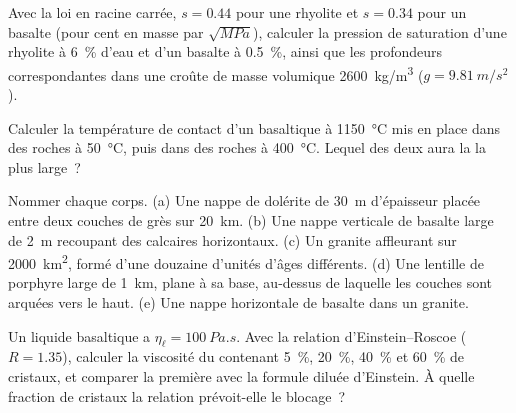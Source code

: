 \begin{exercise}[$\star$]\label{exo:b2:magma-emplacement:2}
Avec la loi en racine carrée, $s = 0.44$ pour une rhyolite et $s = 0.34$ pour un basalte
(pour cent en masse par $\sqrt{\unit{MPa}}$), calculer la pression de saturation d'une
rhyolite à \qty{6}{\percent} d'eau et d'un basalte à \qty{0.5}{\percent}, ainsi que les
profondeurs correspondantes dans une croûte de masse volumique \qty{2600}{kg/m^3}
($g = \qty{9.81}{m/s^2}$).
\end{exercise}

\begin{exercise}[$\star$]\label{exo:b2:magma-emplacement:3}
Calculer la température de contact d'un  basaltique à \qty{1150}{\celsius}
mis en place dans des roches à \qty{50}{\celsius}, puis dans des roches à
\qty{400}{\celsius}. Lequel des deux  aura la  la plus large~?
\end{exercise}

\begin{exercise}[$\star$]\label{exo:b2:magma-emplacement:4}
Nommer chaque corps. (a) Une nappe de dolérite de \qty{30}{m} d'épaisseur placée entre deux couches
de grès sur \qty{20}{km}. (b) Une nappe verticale de basalte large de \qty{2}{m}
recoupant des calcaires horizontaux. (c) Un granite affleurant sur \qty{2000}{km^2},
formé d'une douzaine d'unités d'âges différents. (d) Une lentille de porphyre large de \qty{1}{km},
plane à sa base, au-dessus de laquelle les couches sont arquées vers le haut. (e) Une nappe horizontale
de basalte dans un granite.
\end{exercise}

\begin{exercise}[$\star\star$]\label{exo:b2:magma-emplacement:5}
Un liquide basaltique a $\eta_{\ell} = \qty{100}{Pa.s}$. Avec la relation d'Einstein--Roscoe
($R = 1.35$), calculer la viscosité du  contenant
\qty{5}{\percent}, \qty{20}{\percent}, \qty{40}{\percent} et \qty{60}{\percent} de
cristaux, et comparer la première avec la formule diluée d'Einstein. À quelle fraction
de cristaux la relation prévoit-elle le blocage~?
\end{exercise}

